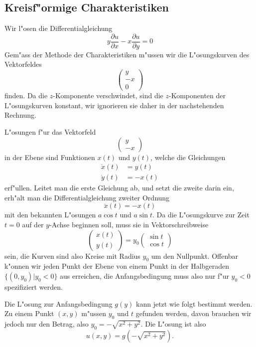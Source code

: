 \subsection{Kreisf"ormige Charakteristiken}
Wir l"osen die Differentialgleichung
$$
y\frac{\partial u}{\partial x}-x\frac{\partial u}{\partial y}=0
$$
Gem"ass der Methode der Charakteristiken m"ussen wir die L"osungskurven
des Vektorfeldes
$$
\begin{pmatrix}
y\\-x\\0
\end{pmatrix}
$$
finden. Da die $z$-Komponente verschwindet, sind die $z$-Komponenten
der L"osungskurven konstant, wir ignorieren sie daher in der nachstehenden
Rechnung.

L"osungen f"ur das Vektorfeld 
$$
\begin{pmatrix}
y\\-x
\end{pmatrix}
$$
in der Ebene sind Funktionen $x(t)$ und $y(t)$, welche die Gleichungen
\begin{align*}
\dot x(t)&=y(t)\\
\dot y(t)&=-x(t)
\end{align*}
erf"ullen. Leitet man die erste Gleichung ab, und setzt die zweite
darin ein, erh"alt man die Differentialgleichung zweiter Ordnung
$$
\ddot x(t)=-x(t)
$$
mit den bekannten L"osungen $a\cos t$ und $a \sin t$. Da die L"osungskurve
zur Zeit $t=0$ auf der $y$-Achse beginnen soll, muss sie in Vektorschreibweise
$$
\begin{pmatrix}
x(t)\\y(t)
\end{pmatrix}
=y_0\begin{pmatrix}
\sin t\\
\cos t
\end{pmatrix}
$$
sein, die Kurven sind also Kreise mit Radius $y_0$ um den Nullpunkt. Offenbar
k"onnen wir jeden Punkt der Ebene von einem Punkt in der Halbgeraden
$\{(0,y_0)|y_0 <0\}$ aus erreichen, die Anfangsbedingung muss also nur f"ur
$y_0<0$ spezifiziert werden.

Die L"osung zur Anfangsbedingung $g(y)$ kann jetzt wie folgt bestimmt werden.
Zu einem Punkt $(x,y)$ m"ussen $y_0$ und $t$ gefunden werden, davon brauchen wir
jedoch nur den Betrag, also $y_0=-\sqrt{x^2+y^2}$. Die L"osung ist also
$$
u(x,y)=g(-\sqrt{x^2+y^2}).
$$

